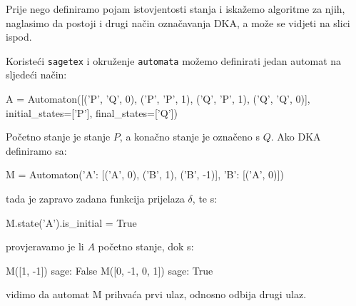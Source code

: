 \documentclass[titlepage]{article}
\begin{document}
\begin{center}
Prije nego definiramo pojam istovjentosti stanja i iskažemo algoritme za njih, naglasimo da postoji i drugi način označavanja DKA, a može se vidjeti na slici ispod.
\end{center}
Koristeći \texttt{sagetex} i okruženje \texttt{automata} možemo definirati jedan automat na sljedeći način: 
\begin{sageblock}
A = Automaton([('P', 'Q', 0), ('P', 'P', 1),
                ('Q', 'P', 1), ('Q', 'Q', 0)],
               initial_states=['P'], final_states=['Q'])
\end{sageblock}
Početno stanje je stanje $P$, a konačno stanje je označeno s $Q$. 
Ako DKA definiramo sa: 
\begin{sageblock}
M = Automaton({'A': [('A', 0), ('B', 1), ('B', -1)], 'B': [('A', 0)]})
\end{sageblock}
tada je zapravo zadana funkcija prijelaza $\delta$, te s:
\begin{sageblock}
M.state('A').is_initial = True
\end{sageblock}
provjeravamo je li $A$ početno stanje, dok s:
\begin{sageblock}
M([1, -1])
sage: False
M([0, -1, 0, 1])
sage: True
\end{sageblock}
vidimo da automat M prihvaća prvi ulaz, odnosno odbija drugi  ulaz.
\end{document}
